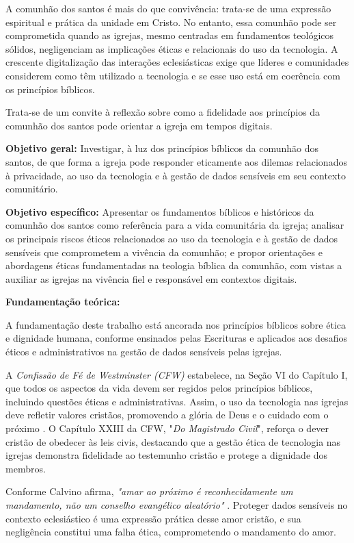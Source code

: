 \documentclass[12pt,a4paper]{article}
\begin{document}
A comunhão dos santos é mais do que convivência: trata-se de uma expressão espiritual e prática da unidade em Cristo. No entanto, essa comunhão pode ser comprometida quando as igrejas, mesmo centradas em fundamentos teológicos sólidos, negligenciam as implicações éticas e relacionais do uso da tecnologia. A crescente digitalização das interações eclesiásticas exige que líderes e comunidades considerem como têm utilizado a tecnologia e se esse uso está em coerência com os princípios bíblicos.

Trata-se de um convite à reflexão sobre como a fidelidade aos princípios da comunhão dos santos pode orientar a igreja em tempos digitais.

\noindent
\textbf{Objetivo geral:} Investigar, à luz dos princípios bíblicos da comunhão dos santos, de que forma a igreja pode responder eticamente aos dilemas relacionados à privacidade, ao uso da tecnologia e à gestão de dados sensíveis em seu contexto comunitário.

\noindent
\textbf{Objetivo específico:} Apresentar os fundamentos bíblicos e históricos da comunhão dos santos como referência para a vida comunitária da igreja; analisar os principais riscos éticos relacionados ao uso da tecnologia e à gestão de dados sensíveis que comprometem a vivência da comunhão; e propor orientações e abordagens éticas fundamentadas na teologia bíblica da comunhão, com vistas a auxiliar as igrejas na vivência fiel e responsável em contextos digitais.

\noindent
\textbf{Fundamentação teórica:}

A fundamentação deste trabalho está ancorada nos princípios bíblicos sobre ética e dignidade humana, conforme ensinados pelas Escrituras e aplicados aos desafios éticos e administrativos na gestão de dados sensíveis pelas igrejas.

A \textit{Confissão de Fé de Westminster (CFW)} estabelece, na Seção VI do Capítulo I, que todos os aspectos da vida devem ser regidos pelos princípios bíblicos, incluindo questões éticas e administrativas. Assim, o uso da tecnologia nas igrejas deve refletir valores cristãos, promovendo a glória de Deus e o cuidado com o próximo \cite{cfw}. O Capítulo XXIII da CFW, "\textit{Do Magistrado Civil}", reforça o dever cristão de obedecer às leis civis, destacando que a gestão ética de tecnologia nas igrejas demonstra fidelidade ao testemunho cristão e protege a dignidade dos membros.

Conforme Calvino afirma, \textit{"amar ao próximo é reconhecidamente um mandamento, não um conselho evangélico aleatório"} \cite[p. 453]{calvino2022}. Proteger dados sensíveis no contexto eclesiástico é uma expressão prática desse amor cristão, e sua negligência constitui uma falha ética, comprometendo o mandamento do amor.
\end{document}
